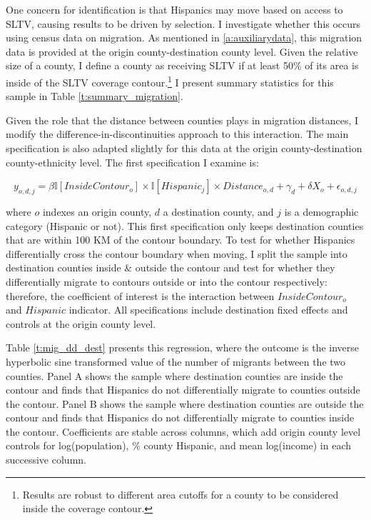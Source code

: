 \documentclass[11pt]{article}
\begin{document}
One concern for identification is that Hispanics may move based on access to SLTV, causing results to be driven by selection. I investigate whether this occurs using census data on migration. As mentioned in \ref{a:auxiliarydata}, this migration data is provided at the origin county-destination county level. Given the relative size of a county, I define a county as receiving SLTV if at least 50\% of its area is inside of the SLTV coverage contour.\footnote{ Results are robust to different area cutoffs for a county to be considered inside the coverage contour.} I present summary statistics for this sample in Table \ref{t:summary_migration}.

Given the role that the distance between counties plays in migration distances, I modify the difference-in-discontinuities approach to this interaction. The main specification is also adapted slightly for this data at the origin county-destination county-ethnicity level. The first specification I examine is:

\[ y_{o,d,j} =  \beta \mathbb{I}[InsideContour_{o}] \times \mathbb{I}[Hispanic_{j}] \times Distance_{o,d} + \gamma_d + \delta  X_o + \epsilon_{o,d,j} \]

where $o$ indexes an origin county, $d$ a destination county, and $j$ is a demographic category (Hispanic or not). This first specification only keeps destination counties that are within 100 KM of the contour boundary. To test for whether Hispanics differentially cross the contour boundary when moving, I split the sample into destination counties inside \& outside the contour and test for whether they differentially migrate to contours outside or into the contour respectively: therefore, the coefficient of interest is the interaction between $InsideContour_o$ and $Hispanic$ indicator. All specifications include destination fixed effects and controls at the origin county level.

Table \ref{t:mig_dd_dest} presents this regression, where the outcome is the inverse hyperbolic sine transformed value of the number of migrants between the two counties. Panel A shows the sample where destination counties are inside the contour and finds that Hispanics do not differentially migrate to counties outside the contour. Panel B shows the sample where destination counties are outside the contour and finds that Hispanics do not differentially migrate to counties inside the contour. Coefficients are stable across columns, which add origin county level controls for log(population), \% county Hispanic, and mean log(income) in each successive column.
\end{document}
